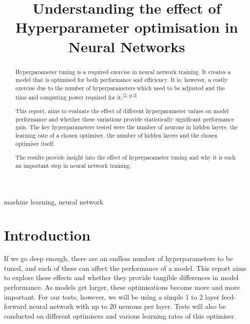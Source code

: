 \documentclass[conference]{IEEEtran}
\begin{document}
\title{Understanding the effect of Hyperparameter optimisation in Neural Networks}

\author{
}

\maketitle

\begin{abstract}
Hyperparameter tuning is a required exercise in neural network training. It creates a model that is optimised for both performance and efficiency. It is, however, a costly exercise due to the number of hyperparameters which need to be adjusted and the time and computing power required for it.\textsuperscript{[2, p.2]}

This report, aims to evaluate the effect of different hyperparameter values on model performance and whether these variations provide statistically significant performance gain. The key hyperparameters tested were the number of neurons in hidden layers, the learning rate of a chosen optimiser, the number of hidden layers and the chosen optimiser itself.

The results provide insight into the effect of hyperparameter tuning and why it is such an important step in neural network training.
\end{abstract}

\begin{IEEEkeywords}
machine learning, neural network
\end{IEEEkeywords}

\section{Introduction}
If we go deep enough, there are an endless number of hyperparameters to be tuned, and each of these can affect the performance of a model. This report aims to explore these effects and whether they provide tangible differences in model performance. As models get larger, these optimisations become more and more important. For our tests, however, we will be using a simple 1 to 2 layer feed-forward neural network with up to 20 neurons per layer. Tests will also be conducted on different optimisers and various learning rates of this optimiser. 
\end{document}

